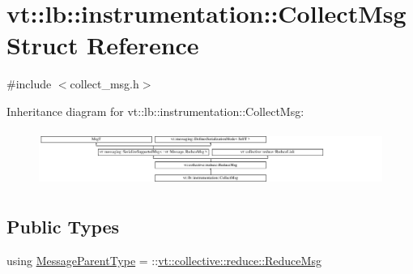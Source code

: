 \hypertarget{structvt_1_1lb_1_1instrumentation_1_1_collect_msg}{}\section{vt\+:\+:lb\+:\+:instrumentation\+:\+:Collect\+Msg Struct Reference}
\label{structvt_1_1lb_1_1instrumentation_1_1_collect_msg}


{\ttfamily \#include $<$collect\+\_\+msg.\+h$>$}

Inheritance diagram for vt\+:\+:lb\+:\+:instrumentation\+:\+:Collect\+Msg\+:\begin{figure}[H]
\begin{center}
\leavevmode
\includegraphics[height=1.843621cm]{structvt_1_1lb_1_1instrumentation_1_1_collect_msg}
\end{center}
\end{figure}
\subsection*{Public Types}
\begin{DoxyCompactItemize}
\item 
using \hyperlink{structvt_1_1lb_1_1instrumentation_1_1_collect_msg_a7775bf9206db8e050e2a60678e71ad7d}{Message\+Parent\+Type} = \+::\hyperlink{structvt_1_1collective_1_1reduce_1_1_reduce_msg}{vt\+::collective\+::reduce\+::\+Reduce\+Msg}
\end{DoxyCompactItemize}
